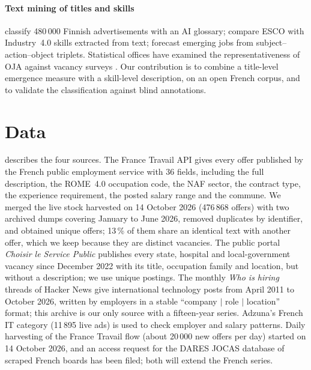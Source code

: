 \documentclass[5p,times,twocolumn,authoryear]{elsarticle}
\begin{document}
\paragraph{Text mining of titles and skills} \citet{back2021} classify 480\,000 Finnish advertisements with an AI glossary; \citet{chiarello2021} compare ESCO with Industry~4.0 skills extracted from text; \citet{kim2026sao} forecast emerging jobs from subject--action--object triplets. Statistical offices have examined the representativeness of OJA against vacancy surveys \citep{beresewicz2021,cedefop2019}. Our contribution is to combine a title-level emergence measure with a skill-level description, on an open French corpus, and to validate the classification against blind annotations.

\section{Data}\label{sec:data}
 describes the four sources. The France Travail API gives every offer published by the French public employment service with 36 fields, including the full description, the ROME~4.0 occupation code, the NAF sector, the contract type, the experience requirement, the posted salary range and the commune. We merged the live stock harvested on 14 October 2026 (476\,868 offers) with two archived dumps covering January to June 2026, removed duplicates by identifier, and obtained \nFT{} unique offers; 13\,\% of them share an identical text with another offer, which we keep because they are distinct vacancies. The public portal \emph{Choisir le Service Public} publishes every state, hospital and local-government vacancy since December 2022 with its title, occupation family and location, but without a description; we use \nCSP{} unique postings. The monthly \emph{Who is hiring} threads of Hacker News give \nHN{} international technology posts from April 2011 to October 2026, written by employers in a stable ``company $|$ role $|$ location'' format; this archive is our only source with a fifteen-year series. Adzuna's French IT category (11\,895 live ads) is used to check employer and salary patterns. Daily harvesting of the France Travail flow (about 20\,000 new offers per day) started on 14 October 2026, and an access request for the DARES JOCAS database of scraped French boards has been filed; both will extend the French series.
\end{document}
